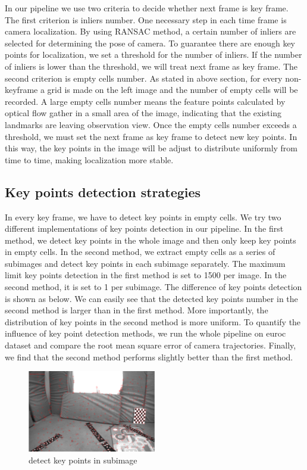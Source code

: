 \documentclass[conference]{IEEEtran}
\begin{document}
In our pipeline we use two criteria to decide whether next frame is key frame. The first criterion is inliers number. One necessary step in each time frame is camera localization. By using RANSAC method, a certain number of inliers are selected for determining the pose of camera. To guarantee there are enough key points for localization, we set a threshold for the number of inliers. If the number of inliers is lower than the threshold, we will treat next frame as key frame. The second criterion is empty cells number. As stated in above section, for every non-keyframe a grid is made on the left image and the number of empty cells will be recorded. A large empty cells number means the feature points calculated by optical flow gather in a small area of the image, indicating that the existing landmarks are leaving observation view. Once the empty cells number exceeds a threshold, we must set the next frame as key frame to detect new key points. In this way, the key points in the image will be adjust to distribute uniformly from time to time, making localization more stable.

\subsection{Key points detection strategies}
In every key frame, we have to detect key points in empty cells. We try two different implementations of key points detection in our pipeline. In the first method, we detect key points in the whole image and then only keep key points in empty cells. In the second method, we extract empty cells as a series of subimages and detect key points in each subimage separately. The maximum limit key points detection in the first method is set to 1500 per image. In the second method, it is set to 1 per subimage. The difference of key points detection is shown as below. We can easily see that the detected key points number in the second method is larger than in the first method. More importantly, the distribution of key points in the second method is more uniform. To quantify the influence of key point detection methods, we run the whole pipeline on euroc dataset and compare the root mean square error of camera trajectories. Finally, we find that the second method performs slightly better than the first method.


\begin{figure}[h!]

\centering
\includegraphics[width=0.5\textwidth]{img/subimage_keypoint_detection_129.png}
\caption{detect key points in subimage}
\label{fig:subimage}
\end{figure}
\end{document}
